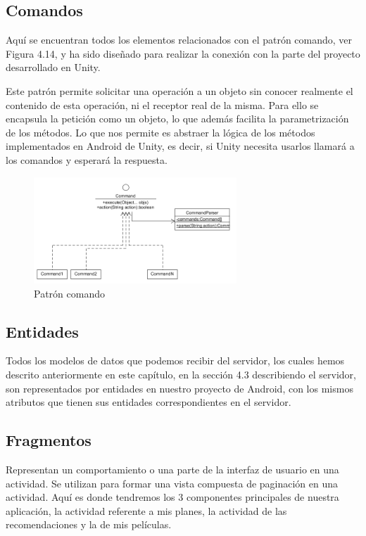 \subsection{Comandos}
\label{makereference4.4.3}
Aquí se encuentran todos los elementos relacionados con el patrón comando, ver Figura 4.14, y ha sido diseñado para realizar la conexión con la parte del proyecto desarrollado en Unity.

Este patrón permite solicitar una operación a un objeto sin conocer realmente el contenido de esta operación, ni el receptor real de la misma. Para ello se encapsula la petición como un objeto, 
lo que además facilita la parametrización de los métodos.
Lo que nos permite es abstraer la lógica de los métodos implementados en Android de Unity, es decir, si Unity necesita usarlos llamará a los comandos y esperará la respuesta.

\begin{figure}[H]
    \centering
    \includegraphics[width=3in]{figures/chapter-4/command_pattern.png}
    \caption{Patrón comando}
\end{figure}



\subsection{Entidades}
\label{makereference4.4.4}
Todos los modelos de datos que podemos recibir del servidor, los cuales hemos descrito anteriormente en este capítulo, en la sección 4.3 describiendo el servidor, son representados por entidades en nuestro proyecto de Android, con los mismos atributos que tienen sus entidades correspondientes en el servidor.

\subsection{Fragmentos}
\label{makereference4.4.5}
Representan un comportamiento o una parte de la interfaz de usuario en una actividad.
Se utilizan para formar una vista compuesta de paginación en una actividad. 
Aquí es donde tendremos los 3 componentes principales de nuestra aplicación, la actividad referente a mis planes, la actividad de las recomendaciones y la de mis películas.

